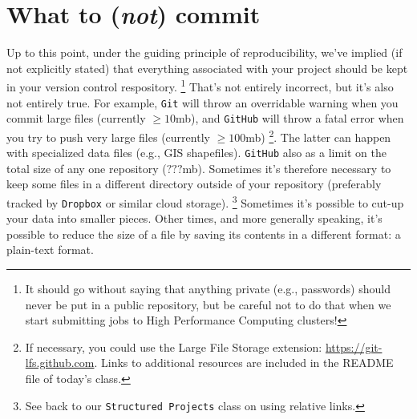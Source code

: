 \documentclass[12pt,letterpaper]{article}
\begin{document}
\section{What to (\emph{not}) commit}

Up to this point, under the guiding principle of reproducibility, 
we've implied (if not explicitly stated) that everything associated with your 
project should be kept in your version control respository.
\unskip
\footnote{It should go without saying that anything private (e.g., passwords) 
	should never be put in a public repository, 
	but be careful not to do that when we start submitting jobs to High 
	Performance Computing clusters!}
That's not entirely incorrect, but it's also not entirely true.
For example, \texttt{Git} will throw an overridable warning when you commit 
large files (currently $\ge 10$mb), 
and \texttt{GitHub} will throw a fatal error when you try to push very large files 
(currently $\ge 100$mb)
\unskip
\footnote{If necessary, you could use the Large File Storage extension: 
	\url{https://git-lfs.github.com}.  Links to additional resources are included in the README file of today's class.}.
The latter can happen with specialized data files (e.g., GIS shapefiles).
\texttt{GitHub} also as a limit on the total size of any one repository ($???$mb).
Sometimes it's therefore necessary to keep some files in a different directory 
outside of your repository
(preferably tracked by \texttt{Dropbox} or similar cloud storage).
\unskip
\footnote{See back to our \texttt{Structured Projects} class on using relative links.}
Sometimes it's possible to cut-up your data into smaller pieces.
Other times, and more generally speaking, it's possible to reduce the size of a 
file by saving its contents in a different format: a plain-text format.
\end{document}
